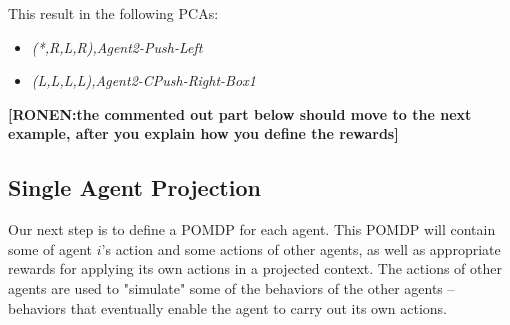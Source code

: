 \documentclass[letterpaper]{article} %
\newcommand{\commentout}[1]{}
\newcommand{\ronen}[1]{\textbf{[\color{blue}RONEN:#1]}}
\newcommand{\pcact}[1]{{\em \textit{PCA$_#1$}}}
\begin{document}
This result in the following PCAs:
\begin{itemize}
    \item \emph{(*,R,L,R),Agent2-Push-Left}
    \item \emph{(L,L,L,L),Agent2-CPush-Right-Box1}
\end{itemize}
\ronen{the commented out part below should move to the next example, after you explain how
you define the rewards}
\commentout{
Thus, in the single-agent problem, \emph{Agent2} will be rewarded for pushing \emph{Box2} to the left regardless of \emph{Agent1}'s position, but to push $Box1$ it will need to reason about $Agent1$'s position - although in a very shallow manner as it is a private variable of $Agent1$.
Each of the PCAs will be assigned with a different reward. Such difference will assist in determining both the priority and the order in which the agent chooses to apply the PCAs.
We will now describe how the single-agent problems are constructed, given the PCAs and their rewards.
How the reward values are computed will be described afterwards. We will use $Rewards_i$ to refer to the set
of reward values associated with $\pcact{i}$.
}

\subsection{Single Agent Projection}
Our next step is to define a POMDP for each agent. This POMDP will contain some of agent $i$'s action and some actions of other agents,
as well as appropriate rewards for applying its own actions in a
projected context. 
The actions of other agents are used to "simulate" some of the behaviors of the other agents -- behaviors that eventually enable the agent to carry out its own actions.
\end{document}
